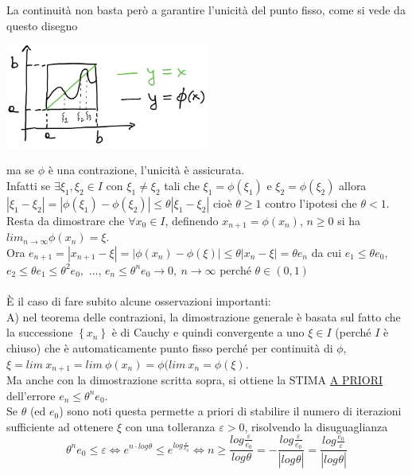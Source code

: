 \documentclass[12pt]{article}
\begin{document}
La continuità non basta però a garantire l'unicità del punto fisso, come si vede da questo disegno
\begin{center}
    \includegraphics[width=0.5\textwidth]{img1_pag7.png}
\end{center}
ma se $\phi$ è una contrazione, l'unicità è assicurata. \\
Infatti se $\exists \xi_1, \xi_2 \in I$ con $\xi_1 \neq \xi_2$ tali che $\xi_1 = \phi(\xi_1)$ e $\xi_2 = \phi(\xi_2)$ allora $|\xi_1 - \xi_2| = |\phi(\xi_1) - \phi(\xi_2)| \leq \theta|\xi_1 - \xi_2|$ cioè $\theta \geq 1$ contro l'ipotesi che $\theta < 1$. \\
Resta da dimostrare che $\forall x_0 \in I$, definendo $x_{n+1} = \phi(x_n)$, $n \geq 0$ si ha $lim_{n\to\infty} \phi(x_n) = \xi$. \\
Ora $e_{n+1} = |x_{n+1} - \xi| = |\phi(x_n) - \phi(\xi)| \leq \theta|x_n - \xi| = \theta e_n$ da cui $e_1 \leq \theta e_0,$  $e_2 \leq \theta e_1 \leq \theta^2 e_0,$ $ \dotsc$,   $e_n \leq \theta^n e_0 \to 0, \ n\to\infty$ perché $\theta \in (0,1)$ \\
\vspace{0.5cm} \\
È il caso di fare subito alcune osservazioni importanti: \\
A) nel teorema delle contrazioni, la dimostrazione generale è basata sul fatto che la successione $\left\{ x_n \right\}$ è di Cauchy e quindi convergente a uno $\xi \in I$ (perché $I$ è chiuso) che è automaticamente punto fisso perché per continuità di $\phi$, $\xi = lim \ x_{n+1} = lim \ \phi(x_n) = \phi(lim \ x_n = \phi(\xi)$. \\
Ma anche con la dimostrazione scritta sopra, si ottiene la STIMA \underline{A PRIORI} dell'errore $e_n \leq \theta^n e_0$. \\
Se $\theta$ (ed $e_0$) sono noti questa permette a priori di stabilire il numero di iterazioni sufficiente ad ottenere $\xi$ con una tolleranza $\varepsilon > 0$, risolvendo la disuguaglianza
\begin{equation*}
    \theta^n e_0 \leq \varepsilon \Leftrightarrow e^{n\cdot log_{}{\theta}} \leq e^{log_{}{\frac{\varepsilon}{e_0}}} \Leftrightarrow n \geq \frac{log_{}{\frac{\varepsilon}{e_0}}}{log_{}{\theta}} = -\frac{log_{}{\frac{\varepsilon}{e_0}}}{|log_{}{\theta}|} = \frac{log_{}{\frac{e_0}{\varepsilon}}}{|log_{}{\theta}|}
\end{equation*}
\end{document}
